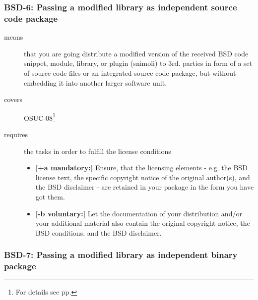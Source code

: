 \subsubsection{BSD-6: Passing a modified library as independent source code
package}
\label{OSUC-08-BSD}
\begin{description}
\item[means] that you are going distribute a modified version of the received
BSD code snippet, module, library, or plugin (snimoli) to 3rd. parties in form
of a set of source code files or an integrated source code package, but without
embedding it into another larger software unit.
\item[covers] OSUC-08\footnote{For details see pp. \pageref{OSUC-08-DEF}}
\item[requires] the tasks in order to fulfill the license conditions
\begin{itemize}
  \item \textbf{[+a mandatory:]} Ensure, that the licensing elements - e.g.
  the BSD license text, the specific copyright notice of the original author(s),
  and the BSD disclaimer - are retained in your package in the form you have got
  them.
  \item \textbf{[-b voluntary:]} Let the documentation of your distribution
  and/or your additional material also contain the original copyright notice, the
  BSD conditions, and the BSD disclaimer.
\end{itemize}
\end{description}


\subsubsection{BSD-7: Passing a modified library as independent binary
package}


